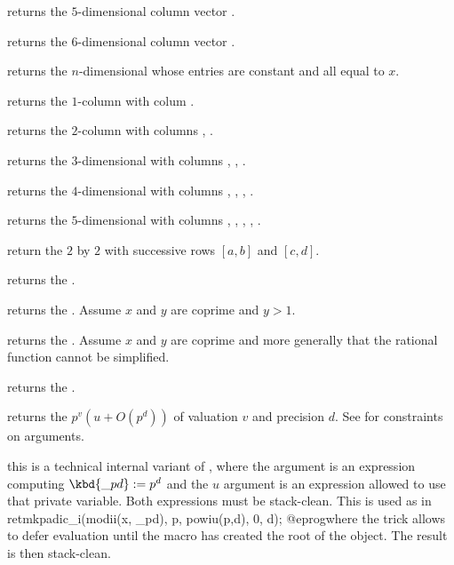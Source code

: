 returns the $5$-dimensional column vector \kbd{[x,y,z,t,u]~}.

returns the $6$-dimensional column vector \kbd{[x,y,z,t,u,v]~}.

returns the $n$-dimensional  whose entries are constant and all
equal to $x$.

returns the $1$-column  with colum .

returns the $2$-column  with columns , .

returns the $3$-dimensional  with columns
, , .

returns the $4$-dimensional  with columns
, , , .

returns the $5$-dimensional  with columns
, , , , .

 return the $2$ by $2$
 with successive rows $[a,b]$ and $[c,d]$.

returns the  .

returns the  . Assume $x$ and $y$ are coprime and $y > 1$.

returns the  . Assume $x$ and $y$ are coprime and more
generally that the rational function cannot be simplified.

returns the  .

 returns the
 $p^v(u + O(p^d))$ of valuation $v$ and precision $d$. See
 for constraints on arguments.

 this is a
technical internal variant of , where the  argument is
an expression computing $\kbd{\_pd} := p^d$ and the $u$ argument is
an expression allowed to use that private  variable. Both
expressions must be stack-clean. This is used as in
\bprog
  retmkpadic_i(modii(x, _pd), p, powiu(p,d), 0, d);
@eprog\noindent where the  trick allows to defer evaluation until
the macro has created the  root of the object. The result is then
stack-clean.

